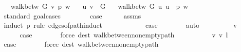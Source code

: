\begin{isabellebody}
\ \ \ {\isachardoublequoteopen}walk{\isacharunderscore}{\kern0pt}betw\ G\ v\ p\ w{\isachardoublequoteclose}\isanewline
\ \ \ {\isachardoublequoteopen}{\isacharbraceleft}{\kern0pt}u{\isacharcomma}{\kern0pt}\ v{\isacharbraceright}{\kern0pt}\ {\isasymin}\ G{\isachardoublequoteclose}\isanewline
\ \ \ {\isachardoublequoteopen}walk{\isacharunderscore}{\kern0pt}betw\ G\ u\ {\isacharparenleft}{\kern0pt}u\ {\isacharhash}{\kern0pt}\ p{\isacharparenright}{\kern0pt}\ w{\isachardoublequoteclose}%
\endisataginvisible
{\isafoldinvisible}%
%
\isadeliminvisible
\isanewline
%
\endisadeliminvisible
%
\isadelimproof
%
\endisadelimproof
%
\isatagproof
{}\isamarkupfalse%
\ {\isacharparenleft}{\kern0pt}standard{\isacharcomma}{\kern0pt}\ goal{\isacharunderscore}{\kern0pt}cases{\isacharparenright}{\kern0pt}\isanewline
\ \ \isamarkupfalse%
\ {}\isanewline
\ \ \isamarkupfalse%
\ {\isacharquery}{\kern0pt}case\isanewline
\ \ \ \ \isamarkupfalse%
\ assms\isanewline
\ \ \isamarkupfalse%
\ {\isacharparenleft}{\kern0pt}induct\ p\ rule{\isacharcolon}{\kern0pt}\ edges{\isacharunderscore}{\kern0pt}of{\isacharunderscore}{\kern0pt}path{\isachardot}{\kern0pt}induct{\isacharparenright}{\kern0pt}\isanewline
\ \ \ \ \isamarkupfalse%
\ {}\isanewline
\ \ \ \ \isamarkupfalse%
\ {\isacharquery}{\kern0pt}case\isanewline
\ \ \ \ \ \ \isamarkupfalse%
\ auto\isanewline
\ \ \isamarkupfalse%
\isanewline
\ \ \ \ \isamarkupfalse%
\ {\isacharparenleft}{\kern0pt}{}\ v{\isacharparenright}{\kern0pt}\isanewline
\ \ \ \ \isamarkupfalse%
\ {\isacharquery}{\kern0pt}case\isanewline
\ \ \ \ \ \ \isamarkupfalse%
\ {\isacharparenleft}{\kern0pt}force\ dest{\isacharcolon}{\kern0pt}\ walk{\isacharunderscore}{\kern0pt}between{\isacharunderscore}{\kern0pt}nonempty{\isacharunderscore}{\kern0pt}path{\isacharparenleft}{\kern0pt}{}{\isacharcomma}{\kern0pt}\ {}{\isacharparenright}{\kern0pt}{\isacharparenright}{\kern0pt}\isanewline
\ \ \isamarkupfalse%
\isanewline
\ \ \ \ \isamarkupfalse%
\ {\isacharparenleft}{\kern0pt}{}\ v\ v{\isacharprime}{\kern0pt}\ l{\isacharparenright}{\kern0pt}\isanewline
\ \ \ \ \isamarkupfalse%
\ {\isacharquery}{\kern0pt}case\isanewline
\ \ \ \ \ \ \isamarkupfalse%
\ {\isacharparenleft}{\kern0pt}force\ dest{\isacharcolon}{\kern0pt}\ walk{\isacharunderscore}{\kern0pt}between{\isacharunderscore}{\kern0pt}nonempty{\isacharunderscore}{\kern0pt}path{\isacharparenleft}{\kern0pt}{}{\isacharcomma}{\kern0pt}\ {}{\isacharparenright}{\kern0pt}{\isacharparenright}{\kern0pt}\isanewline

\end{isabellebody}
